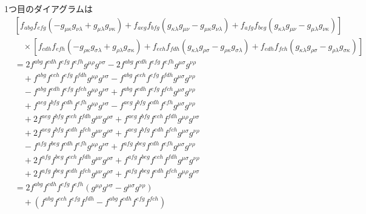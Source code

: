 1つ目のダイアグラムは
\begin{align*}
  & \left[ f_{abg} f_{efg} \left(- g_{\mu\kappa} g_{\nu\lambda} + g_{\mu\lambda} g_{\nu\kappa}\right)
  + f_{aeg} f_{bfg} \left(g_{\kappa\lambda} g_{\mu\nu} - g_{\mu\kappa} g_{\nu\lambda}\right)
  + f_{afg} f_{beg} \left(g_{\kappa\lambda} g_{\mu\nu} - g_{\mu\lambda} g_{\nu\kappa}\right) \right] \\
  &\quad\times \left[ f_{cdh} f_{efh} \left(- g_{\rho\kappa} g_{\sigma\lambda} + g_{\rho\lambda} g_{\sigma\kappa}\right)
  + f_{ech} f_{fdh} \left(g_{\kappa\lambda} g_{\rho\sigma} - g_{\rho\kappa} g_{\sigma\lambda}\right)
  + f_{edh} f_{fch} \left(g_{\kappa\lambda} g_{\rho\sigma} - g_{\rho\lambda} g_{\sigma\kappa}\right) \right] \\
  &=
  2 f^{abg} f^{cdh} f^{efg} f^{efh} g^{\mu\rho} g^{\nu\sigma}
  - 2 f^{abg} f^{cdh} f^{efg} f^{efh} g^{\mu\sigma} g^{\nu\rho}
  \\ &\quad
  + f^{abg} f^{ech} f^{efg} f^{fdh} g^{\mu\rho} g^{\nu\sigma}
  - f^{abg} f^{ech} f^{efg} f^{fdh} g^{\mu\sigma} g^{\nu\rho}
  \\ &\quad
  - f^{abg} f^{edh} f^{efg} f^{fch} g^{\mu\rho} g^{\nu\sigma}
  + f^{abg} f^{edh} f^{efg} f^{fch} g^{\mu\sigma} g^{\nu\rho}
  \\ &\quad
  + f^{aeg} f^{bfg} f^{cdh} f^{efh} g^{\mu\rho} g^{\nu\sigma}
  - f^{aeg} f^{bfg} f^{cdh} f^{efh} g^{\mu\sigma} g^{\nu\rho}
  \\ &\quad
  + 2 f^{aeg} f^{bfg} f^{ech} f^{fdh} g^{\mu\nu} g^{\rho\sigma}
  + f^{aeg} f^{bfg} f^{ech} f^{fdh} g^{\mu\rho} g^{\nu\sigma}
  \\ &\quad
  + 2 f^{aeg} f^{bfg} f^{edh} f^{fch} g^{\mu\nu} g^{\rho\sigma}
  + f^{aeg} f^{bfg} f^{edh} f^{fch} g^{\mu\sigma} g^{\nu\rho}
  \\ &\quad
  - f^{afg} f^{beg} f^{cdh} f^{efh} g^{\mu\rho} g^{\nu\sigma}
  + f^{afg} f^{beg} f^{cdh} f^{efh} g^{\mu\sigma} g^{\nu\rho}
  \\ &\quad
  + 2 f^{afg} f^{beg} f^{ech} f^{fdh} g^{\mu\nu} g^{\rho\sigma}
  + f^{afg} f^{beg} f^{ech} f^{fdh} g^{\mu\sigma} g^{\nu\rho}
  \\ &\quad
  + 2 f^{afg} f^{beg} f^{edh} f^{fch} g^{\mu\nu} g^{\rho\sigma}
  + f^{afg} f^{beg} f^{edh} f^{fch} g^{\mu\rho} g^{\nu\sigma}
  \\
  & =
  2 f^{abg} f^{cdh} f^{efg} f^{efh} (g^{\mu\rho} g^{\nu\sigma} - g^{\mu\sigma} g^{\nu\rho})
  \\ &\quad
  + (f^{abg} f^{ech} f^{efg} f^{fdh} - f^{abg} f^{edh} f^{efg} f^{fch})

\end{align*}
